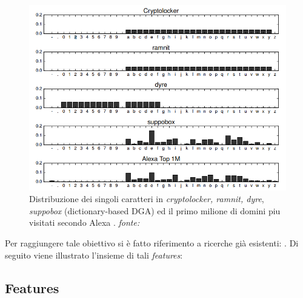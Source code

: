 \begin{figure}[htb]
    \centering
    \includegraphics[width=0.8\columnwidth]{figures/chardistr.png}
    \caption{Distribuzione dei singoli caratteri in \textit{cryptolocker, ramnit, dyre}, \textit{suppobox} (dictionary-based DGA) ed il primo milione di domini piu visitati secondo Alexa \cite{amazon:alexa}.
\textit{fonte:} \cite{deepdga}}
\label{fig:relu}
\end{figure}


Per raggiungere tale obiettivo si è fatto riferimento a ricerche già esistenti: \cite{180232} \cite{Yadav:2010:DAG:1879141.1879148} \cite{Yadav:2012:DAG:2428696.2428722} \cite{Schiavoni2014}. Di seguito viene illustrato l'insieme di tali \textit{features}:

\subsection{Features}
\label{randomforestinterno}

